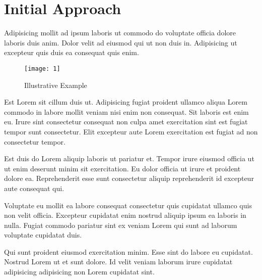\section{Initial Approach}
\label{sec:initial_approach}
Adipisicing mollit ad ipsum laboris ut commodo do voluptate officia dolore laboris duis anim. Dolor velit ad eiusmod qui ut non duis in. Adipisicing ut excepteur quis duis ea consequat quis enim.

\begin{figure}[!h]
    \centering
    \texttt{[image: 1]}
    \caption{Illustrative Example}
    \label{fig:illustrative_example}
\end{figure}

Est Lorem sit cillum duis ut. Adipisicing fugiat proident ullamco aliqua Lorem commodo in labore mollit veniam nisi enim non consequat. Sit laboris est enim eu. Irure sint consectetur consequat non culpa amet exercitation sint est fugiat tempor sunt consectetur. Elit excepteur aute Lorem exercitation est fugiat ad non consectetur tempor.

Est duis do Lorem aliquip laboris ut pariatur et. Tempor irure eiusmod officia ut ut enim deserunt minim sit exercitation. Eu dolor officia ut irure et proident dolore ea. Reprehenderit esse sunt consectetur aliquip reprehenderit id excepteur aute consequat qui.

Voluptate eu mollit ea labore consequat consectetur quis cupidatat ullamco quis non velit officia. Excepteur cupidatat enim nostrud aliquip ipsum ea laboris in nulla. Fugiat commodo pariatur sint ex veniam Lorem qui sunt ad laborum voluptate cupidatat duis.

Qui sunt proident eiusmod exercitation minim. Esse sint do labore eu cupidatat. Nostrud Lorem ut et sunt dolore. Id velit veniam laborum irure cupidatat adipisicing adipisicing non Lorem cupidatat sint.
